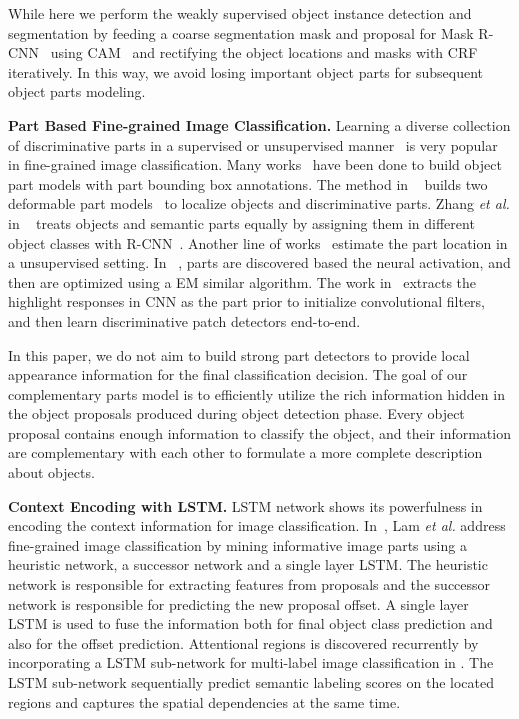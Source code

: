 \documentclass[10pt,twocolumn,letterpaper]{article}
\begin{document}
While here we perform the weakly supervised object instance detection and segmentation by feeding a coarse segmentation mask and proposal for Mask R-CNN~\cite{he2017mask} using CAM~\cite{zhou2016learning} and rectifying the object locations and masks with CRF~\cite{sutton2012introduction} iteratively. In this way, we avoid losing important object parts for subsequent object parts modeling.



\noindent\textbf{Part Based Fine-grained Image Classification.} Learning a diverse collection of discriminative parts in a supervised\cite{zhang2013deformable,zhang2014part} or unsupervised manner~\cite{simon2015neural,zheng2017learning,lam2017fine} is very popular in fine-grained image classification. Many works~\cite{zhang2013deformable,zhang2014part} have been done to build object part models with part bounding box annotations. The method in ~\cite{zhang2013deformable} builds two deformable part models~\cite{felzenszwalb2008discriminatively} to localize objects and discriminative parts. Zhang {\em et al.} in ~\cite{zhang2014part} treats objects and semantic parts equally by assigning them in different object classes with R-CNN~\cite{girshick2014rich}. Another line of works~\cite{simon2015neural,zheng2017learning,lam2017fine,Wang_2018_CVPR} estimate the part location in a unsupervised setting. In ~\cite{simon2015neural}, parts are discovered based the neural activation, and then are optimized using a EM similar algorithm. The work in~\cite{simon2015neural} extracts the highlight responses in CNN as the part prior to initialize convolutional filters, and then learn discriminative patch detectors end-to-end.

In this paper, we do not aim to build strong part detectors to provide local appearance information for the final classification decision. The goal of our complementary parts model is to efficiently utilize the rich information hidden in the object proposals produced during object detection phase. Every object proposal contains enough information to classify the object, and their information are complementary with each other to formulate a more complete description about objects.

\noindent\textbf{Context Encoding with LSTM.} LSTM network shows its powerfulness in encoding the context information for image classification. In~\cite{lam2017fine}, Lam {\em et al.} address fine-grained image classification by mining informative image parts using a heuristic network, a successor network and a single layer LSTM. The heuristic network is responsible for extracting features from proposals and the successor network is responsible for predicting the new proposal offset. A single layer LSTM is used to fuse the information both for final object class prediction and also for the offset prediction. Attentional regions is discovered recurrently by incorporating a LSTM sub-network for multi-label image classification in \cite{wang2017multi}. The LSTM sub-network sequentially predict semantic labeling scores on the located regions and captures the spatial dependencies at the same time.
\end{document}
